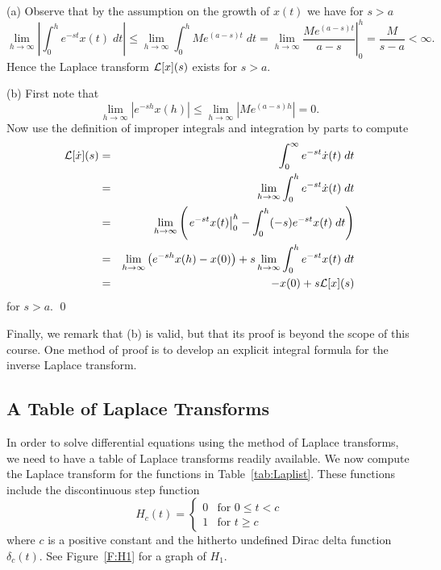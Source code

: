 \documentclass{ximera}
\begin{document}
\proof 
\noindent (a) Observe that by the assumption on the growth of 
$x(t)$ we have for $s>a$
\[
\lim\limits_{h\to \infty}\left|\int_0^h e^{-st} x(t)\; dt\right|
\le \lim\limits_{h\to \infty}\int_0^h Me^{(a-s)t}\; dt
=\lim\limits_{h\to \infty}\left.\frac{Me^{(a-s)t}}{a-s}\right|_0^h
=\frac{M}{s-a}<\infty.
\]
Hence the Laplace transform ${\cal L}[x](s)$ exists for $s>a$.

\noindent(b) First note that
\[
\lim\limits_{h\to \infty} |e^{-sh} x(h)|\le
\lim\limits_{h\to \infty} |Me^{(a-s)h}| = 0.
\]
Now use the definition of improper integrals and integration by parts to 
compute 
\begin{eqnarray*}
{\cal L}[\dot x](s) &=& \int_0^{\infty} e^{-st} \dot x(t)\; dt\\
& = & \lim\limits_{h\to \infty}\int_0^h e^{-st} \dot x(t)\; dt\\
& = & \lim\limits_{h\to \infty}\left(\left.e^{-st}x(t)\right|_0^h -
\int_0^h (-s)e^{-st} x(t)\; dt\right)\\
&=& \lim\limits_{h\to \infty} \left( e^{-sh} x(h) - x(0)\right) +
s\lim\limits_{h\to \infty} \int_0^h e^{-st} x(t)\; dt\\
&=& -x(0) + s{\cal L}[x](s)
\end{eqnarray*}
for $s>a$.  \qed

Finally, we remark that (b) is valid, but that its proof is 
beyond the scope of this course.  One method of proof is to develop an 
explicit integral formula for the inverse Laplace transform. 


\subsection*{A Table of Laplace Transforms}

In order to solve differential equations using the method of Laplace 
transforms, we need to have a table of Laplace transforms readily available.  
We now compute the Laplace transform for the functions in 
Table~\ref{tab:Laplist}.   These functions include the discontinuous step 
function 
\[
H_c(t) = \left\{\begin{array}{ll}
0 & \mbox{for $0\le t < c$}\\
1 & \mbox{for $t\ge c$}
\end{array}\right. 
\]
where $c$ is a positive constant and the hitherto undefined Dirac delta 
function $\delta_c(t)$.  See Figure~\ref{F:H1} for a graph of $H_1$.
\end{document}
